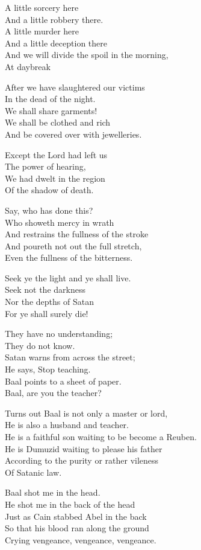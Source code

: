 \documentclass[
]{book}
\begin{document}
A little sorcery here\\
And a little robbery there.\\
A little murder here\\
And a little deception there\\
And we will divide the spoil in the morning,\\
At daybreak

After we have slaughtered our victims\\
In the dead of the night.\\
We shall share garments!\\
We shall be clothed and rich\\
And be covered over with jewelleries.

Except the Lord had left us\\
The power of hearing,\\
We had dwelt in the region\\
Of the shadow of death.

Say, who has done this?\\
Who showeth mercy in wrath\\
And restrains the fullness of the stroke\\
And poureth not out the full stretch,\\
Even the fullness of the bitterness.

Seek ye the light and ye shall live.\\
Seek not the darkness\\
Nor the depths of Satan\\
For ye shall surely die!

They have no understanding;\\
They do not know.\\
Satan warns from across the street;\\
He says, Stop teaching.\\
Baal points to a sheet of paper.\\
Baal, are you the teacher?

Turns out Baal is not only a master or lord,\\
He is also a husband and teacher.\\
He is a faithful son waiting to be become a Reuben.\\
He is Dumuzid waiting to please his father\\
According to the purity or rather vileness\\
Of Satanic law.

Baal shot me in the head.\\
He shot me in the back of the head\\
Just as Cain stabbed Abel in the back\\
So that his blood ran along the ground\\
Crying vengeance, vengeance, vengeance.
\end{document}
